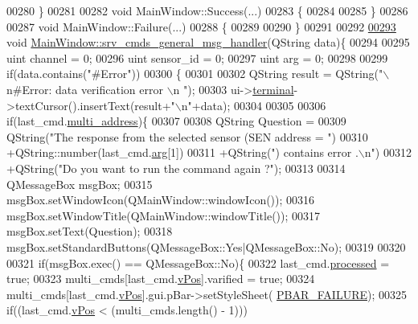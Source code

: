 \begin{DoxyCode}
{{{{{{{{{{{{{{{00280 \}
00281 
00282 \textcolor{keywordtype}{void} MainWindow::Success(...)
00283 \{
00284 
00285 \}
00286 
00287 \textcolor{keywordtype}{void} MainWindow::Failure(...)
00288 \{
00289 
00290 \}
00291 
00292 
\hypertarget{a00136_source_l00293}{}\hyperlink{a00017_a8a8cd34488e8ee213350afb5b2261677}{00293} \textcolor{keywordtype}{void} \hyperlink{a00017_a8a8cd34488e8ee213350afb5b2261677}{MainWindow::srv\_cmds\_general\_msg\_handler}(QString data)\{
00294 
00295 uint  channel   = 0;
00296 uint  sensor\_id = 0;
00297 uint  arg       = 0;
00298 
00299     \textcolor{keywordflow}{if}(data.contains(\textcolor{stringliteral}{"#Error"}))
00300     \{
00301 
00302          QString result =  QString(\textcolor{stringliteral}{"\(\backslash\)n#Error: data verification error \(\backslash\)n "});
00303          ui->\hyperlink{a00080_aae71c46ea4546df5994735dee573b2dd}{terminal}->textCursor().insertText(result+\textcolor{stringliteral}{"\(\backslash\)n"}+data);
00304 
00305 
00306              \textcolor{keywordflow}{if}(last\_cmd.\hyperlink{a00004_a8e69b971c61ced27a7567efd2bf0db59}{multi\_address})\{
00307 
00308                  QString Question =
00309                          QString(\textcolor{stringliteral}{"The response from the selected sensor (SEN address = "})
00310                          +QString::number(last\_cmd.\hyperlink{a00004_a56e6c2d7315d0ae60a51e8b140c9cfe4}{arg}[1])
00311                          +QString(\textcolor{stringliteral}{") contains error .\(\backslash\)n"})
00312                          +QString(\textcolor{stringliteral}{"Do you want to run the command again ?"});
00313 
00314                  QMessageBox msgBox;
00315                  msgBox.setWindowIcon(QMainWindow::windowIcon());
00316                  msgBox.setWindowTitle(QMainWindow::windowTitle());
00317                  msgBox.setText(Question);
00318                  msgBox.setStandardButtons(QMessageBox::Yes|QMessageBox::No);
00319 
00320 
00321                  \textcolor{keywordflow}{if}(msgBox.exec() == QMessageBox::No)\{
00322                  last\_cmd.\hyperlink{a00004_a3e88f779da9798a5da7dda227e2ca388}{processed} = \textcolor{keyword}{true};
00323                  multi\_cmds[last\_cmd.\hyperlink{a00004_a2b48b371fd84be2a8ad581b1ad708b88}{vPos}].varified = \textcolor{keyword}{true};
00324                  multi\_cmds[last\_cmd.\hyperlink{a00004_a2b48b371fd84be2a8ad581b1ad708b88}{vPos}].gui.pBar->setStyleSheet(
      \hyperlink{a00090_aa9f43b2774395af6510910f8feed7cb4}{PBAR\_FAILURE});
00325                  \textcolor{keywordflow}{if}((last\_cmd.\hyperlink{a00004_a2b48b371fd84be2a8ad581b1ad708b88}{vPos} < (multi\_cmds.length() - 1)))
}}}}}}}}}}}}}}}
\end{DoxyCode}
